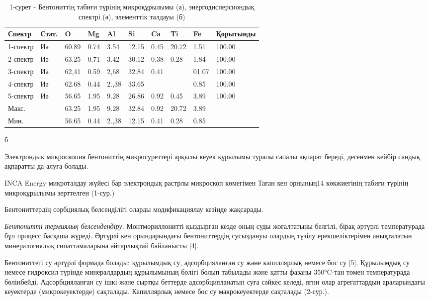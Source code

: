 \begin{table}[H]
\centering
\begin{tabular}{|l|l|l|l|l|l|l|l|l|l|}
\hline
Спектр & Стат. & O & Mg & Al & Si & Ca & Ti & Fe & Қорытынды \\ \hline
1-спектр & Иә & 60.89 & 0.74 & 3.54 & 12.15 & 0.45 & 20.72 & 1.51 & 100.00 \\ \hline
2-спектр & Иә & 63.25 & 0.71 & 3.42 & 30.12 & 0.38 & 0.28 & 1.84 & 100.00 \\ \hline
3-спектр & Иә & 62,41 & 0.59 & 2,68 & 32.84 & 0.41 &  & 01.07 & 100.00 \\ \hline
4-спектр & Иә & 62.68 & 0.44 & 2.,38 & 33.65 &  &  & 0.85 & 100.00 \\ \hline
5-спектр & Иә & 56.65 & 1.95 & 9.28 & 26.86 & 0.92 & 0.45 & 3.89 & 100.00 \\ \hline
Макс. &  & 63.25 & 1.95 & 9.28 & 32.84 & 0.92 & 20.72 & 3.89 &  \\ \hline
Мин. &  & 56.65 & 0.44 & 2.,38 & 12.15 & 0.41 & 0.28 & 0.85 &  \\ \hline
\end{tabular}
\caption*{б}
\caption*{1-сурет - Бентониттің табиғи түрінің микроқұрылымы (а), энергодисперсиондық спектрі (ә), элементтік талдауы (б)}
\end{table}

\begin{multicols}{2}
Электрондық микроскопия бентониттің микросуреттері арқылы кеуек құрылымы
туралы сапалы ақпарат береді, дегенмен кейбір сандық ақпаратты да алуға
болады.

INCA Energy микроталдау жүйесі бар электрондық растрлы микроскоп
көмегімен Таған кен орнының14 көкжиегінің табиғи түрінің микроқұрылымы
зерттелген (1-сур.)

Бентониттердің сорбциялық белсенділігі оларды модификациялау кезінде
жақсарады\emph{.}

\emph{Бентонитті термиялық белсендендіру.} Монтмориллонитті қыздырған
кезде оның суды жоғалтатыны белгілі, бірақ әртүрлі температурада бұл
процесс басқаша жүреді. Әртүрлі кен орындарындағы бентониттердің
сусыздануы олардың түзілу ерекшеліктерімен анықталатын минералогиялық
сипаттамаларына айтарлықтай байланысты {[}4{]}.

Бентониттегі су әртүрлі формада болады: құрылымдық су, адсорбцияланған
су және капиллярлық немесе бос су {[}5{]}. Құрылымдық су немесе
гидроксил түрінде минералдардың құрылымының бөлігі болып табылады және
қатты фазаны 350°C-тан төмен температурада бөлінбейді. Адсорбцияланған
су ішкі және сыртқы беттерде адсорбцияланатын суға сәйкес келеді, яғни
олар агрегаттардың араларындағы кеуектерде (микрокеуектерде) сақталады.
Капиллярлық немесе бос су макрокеуектерде сақталады (2-сур.).
\end{multicols}


